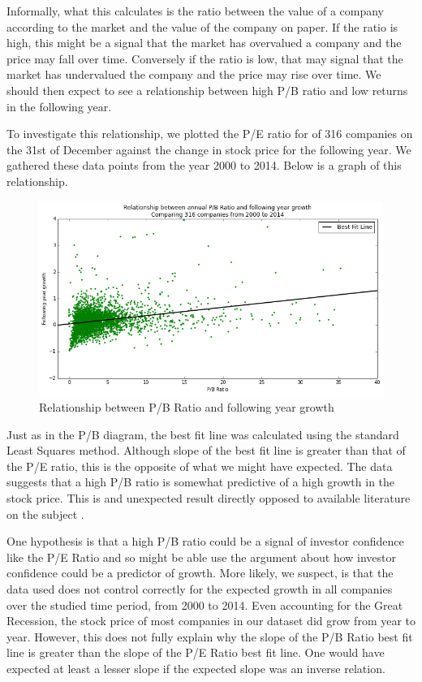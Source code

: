 \documentclass{report}
\begin{document}
Informally, what this calculates is the ratio between the value of a company according to the market and the value of the company on paper. If the ratio is high, this might be a signal that the market has overvalued a company and the price may fall over time. Conversely if the ratio is low, that may signal that the market has undervalued the company and the price may rise over time. We should then expect to see a relationship between high P/B ratio and low returns in the following year. 

To investigate this relationship, we plotted the P/E ratio for of 316 companies on the 31st of December against the change in stock price for the following year. We gathered these data points from the year 2000 to 2014. Below is a graph of this relationship.

\begin{figure}[H]
	\caption{Relationship between P/B Ratio and following year growth}
	\centerline{\includegraphics[width=\textwidth]{vis/pb-ratio-abs.png}}
	\label{fig:pb-abs}
\end{figure}

Just as in the P/B diagram, the best fit line was calculated using the standard Least Squares method. Although slope of the best fit line is greater than that of the P/E ratio, this is the opposite of what we might have expected. The data suggests that a high P/B ratio is somewhat  predictive of a high growth in the stock price. This is and unexpected result directly opposed to available literature on the subject \cite{jensen1997new}. 

One hypothesis is that a high P/B ratio could be a signal of investor confidence like the P/E Ratio and so might be able use the argument about how investor confidence could be a predictor of growth. More likely, we suspect, is that the data used does not control correctly for the expected growth in all companies over the studied time period, from 2000 to 2014. Even accounting for the Great Recession, the stock price of most companies in our dataset did grow from year to year. However, this does not fully explain why the slope of the P/B Ratio best fit line is greater than the slope of the P/E Ratio best fit line. One would have expected at least a lesser slope if the expected slope was an inverse relation. 
\end{document}
